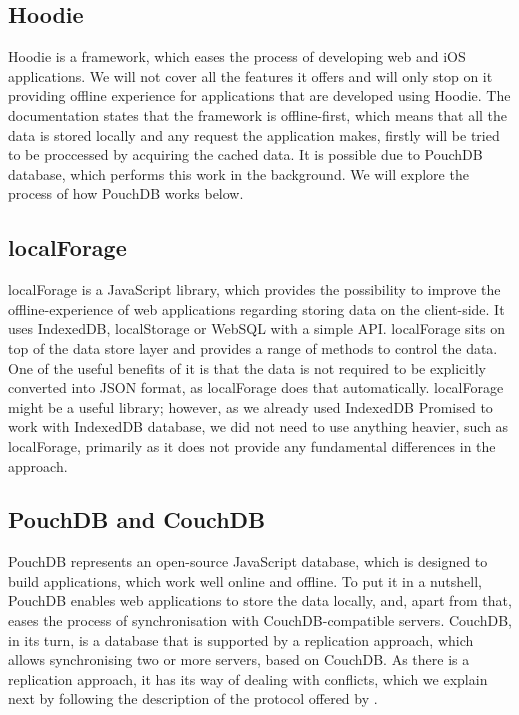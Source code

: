 \subsection*{Hoodie}

Hoodie is a framework, which eases the process of developing web and iOS applications. We will not cover all the features it offers and will only stop on it providing offline experience for applications that are developed using Hoodie. The documentation states that the framework is offline-first\cite{23}, which means that all the data is stored locally and any request the application makes, firstly will be tried to be proccessed by acquiring the cached data. It is possible due to PouchDB database, which performs this work in the background\cite{24}. We will explore the process of how PouchDB works below.

\subsection*{localForage}

localForage is a JavaScript library, which provides the possibility to improve the offline-experience of web applications regarding storing data on the client-side. It uses IndexedDB, localStorage or WebSQL with a simple API. localForage sits on top of the data store layer and provides a range of methods to control the data. One of the useful benefits of it is that the data is not required to be explicitly converted into JSON format, as localForage does that automatically\cite{25}. localForage might be a useful library; however, as we already used IndexedDB Promised to work with IndexedDB database, we did not need to use anything heavier, such as localForage, primarily as it does not provide any fundamental differences in the approach.

\subsection*{PouchDB and CouchDB}

PouchDB represents an open-source JavaScript database, which is designed to build applications, which work well online and offline. To put it in a nutshell, PouchDB enables web applications to store the data locally, and, apart from that, eases the process of synchronisation with CouchDB-compatible servers. CouchDB, in its turn, is a database that is supported by a replication approach, which allows synchronising two or more servers, based on CouchDB. As there is a replication approach, it has its way of dealing with conflicts, which we explain next by following the description of the protocol offered by \citet{26}. 

